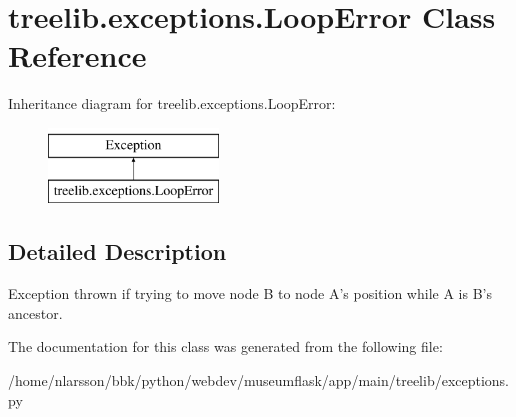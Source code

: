 \hypertarget{classtreelib_1_1exceptions_1_1LoopError}{}\section{treelib.\+exceptions.\+Loop\+Error Class Reference}
\label{classtreelib_1_1exceptions_1_1LoopError}
Inheritance diagram for treelib.\+exceptions.\+Loop\+Error\+:\begin{figure}[H]
\begin{center}
\leavevmode
\includegraphics[height=2.000000cm]{classtreelib_1_1exceptions_1_1LoopError}
\end{center}
\end{figure}


\subsection{Detailed Description}
\begin{DoxyVerb}Exception thrown if trying to move node B to node A's position
while A is B's ancestor.
\end{DoxyVerb}
 

The documentation for this class was generated from the following file\+:\begin{DoxyCompactItemize}
\item 
/home/nlarsson/bbk/python/webdev/museumflask/app/main/treelib/exceptions.\+py\end{DoxyCompactItemize}
